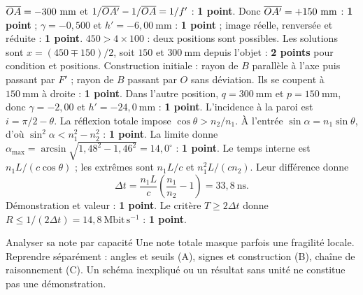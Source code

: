 $\overline{OA}=-300\ \mathrm{mm}$ et $1/\overline{OA'}-1/\overline{OA}=1/f'$ : \textbf{1 point}. Donc $\oap=+150\ \mathrm{mm}$ : \textbf{1 point} ; $\gamma=-0{,}500$ et $h'=-6{,}00\ \mathrm{mm}$ : \textbf{1 point} ; image réelle, renversée et réduite : \textbf{1 point}.
$450>4\times100$ : deux positions sont possibles. Les solutions sont $x=(450\mp150)/2$, soit $150$ et $300\ \mathrm{mm}$ depuis l'objet : \textbf{2 points} pour condition et positions.
Construction initiale : rayon de $B$ parallèle à l'axe puis passant par $F'$ ; rayon de $B$ passant par $O$ sans déviation. Ils se coupent à $150\ \mathrm{mm}$ à droite : \textbf{1 point}. Dans l'autre position, $q=300\ \mathrm{mm}$ et $p=150\ \mathrm{mm}$, donc $\gamma=-2{,}00$ et $h'=-24{,}0\ \mathrm{mm}$ : \textbf{1 point}.
L'incidence à la paroi est $i=\pi/2-\theta$. La réflexion totale impose $\cos\theta>n_2/n_1$. À l'entrée $\sin\alpha=n_1\sin\theta$, d'où $\sin^2\alpha<n_1^2-n_2^2$ : \textbf{1 point}. La limite donne $\alpha_{\max}=\arcsin\sqrt{1{,}48^2-1{,}46^2}=14{,}0^\circ$ : \textbf{1 point}.
Le temps interne est $n_1L/(c\cos\theta)$ ; les extrêmes sont $n_1L/c$ et $n_1^2L/(cn_2)$. Leur différence donne
\[\Delta t=\frac{n_1L}{c}\left(\frac{n_1}{n_2}-1\right)=33{,}8\ \mathrm{ns}.\]
Démonstration et valeur : \textbf{1 point}. Le critère $T\geq2\Delta t$ donne $R\leq1/(2\Delta t)=14{,}8\ \mathrm{Mbit\,s^{-1}}$ : \textbf{1 point}.
\begin{methode}{Analyser sa note par capacité}
Une note totale masque parfois une fragilité locale. Reprendre séparément : angles et seuils (A), signes et construction (B), chaîne de raisonnement (C). Un schéma inexpliqué ou un résultat sans unité ne constitue pas une démonstration.
\end{methode}

